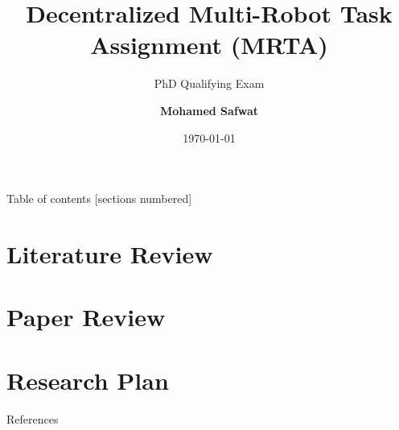 \documentclass[9pt]{beamer}
\title{Decentralized Multi-Robot Task Assignment (MRTA)}
\subtitle{PhD Qualifying Exam}
\date{\today}
\author{\textbf{Mohamed Safwat}}
\institute{Department of Mechanical Engineering, \\ University of Washington Seattle}
\begin{document}
\maketitle
{}

\begin{frame}{Table of contents}
  [sections numbered]
  \tableofcontents[hideallsubsections]
\end{frame}

\section{Literature Review}


\section{Paper Review}


\section{Research Plan}

\appendix

\begin{frame}[allowframebreaks]{References}
    
    
\end{frame}
\end{document}
